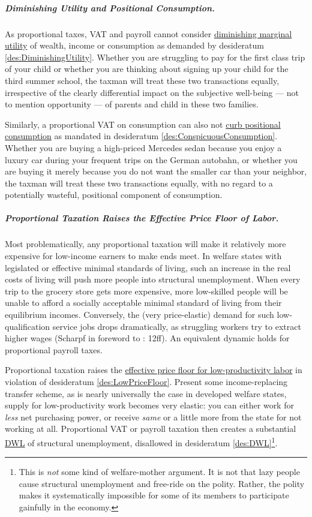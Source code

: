 \subparagraph{Diminishing Utility and Positional Consumption.} As proportional taxes, VAT and payroll cannot consider \hyperref[des:DiminishingUtility]{diminishing marginal utility} of wealth, income or consumption as demanded by desideratum \ref{des:DiminishingUtility}. Whether you are struggling to pay for the first class trip of your child or whether you are thinking about signing up your child for the third summer school, the taxman will treat these two transactions equally, irrespective of the clearly differential impact on the subjective well-being --- not to mention opportunity --- of parents and child in these two families.

Similarly, a proportional VAT on consumption can also not \hyperref[des:ConspicuousConsumption]{curb positional consumption} as mandated in desideratum \ref{des:ConspicuousConsumption}. Whether you are buying a high-priced Mercedes sedan because you enjoy a luxury car during your frequent trips on the German autobahn, or whether you are buying it merely because you do not want the smaller car than your neighbor, the taxman will treat these two transactions equally, with no regard to a potentially wasteful, positional component of consumption.

\subparagraph{Proportional Taxation Raises the Effective Price Floor of Labor.}  \label{sec:PropTaxDWL} Most problematically, any proportional taxation will make it relatively more expensive for low-income earners to make ends meet. In welfare states with legislated or effective minimal standards of living, such an increase in the real costs of living will push more people into structural unemployment. When every trip to the grocery store gets more expensive, more low-skilled people will be unable to afford a socially acceptable minimal standard of living from their equilibrium incomes. Conversely, the (very price-elastic) demand for such low-qualification service jobs drops dramatically, as struggling workers try to extract higher wages (Scharpf in foreword to \citealt{Ganghof2004}: 12ff). An equivalent dynamic holds for proportional payroll taxes.

Proportional taxation raises the \hyperref[des:LowPriceFloor]{effective price floor for low-productivity labor} in violation of desideratum \ref{des:LowPriceFloor}. Present some income-replacing transfer scheme, as is nearly universally the case in developed welfare states, supply for low-productivity work becomes very elastic: you can either work for \emph{less} net purchasing power, or receive \emph{same} or a little more from the state for not working at all. Proportional VAT or payroll taxation then creates a substantial \hyperref[des:DWL]{DWL} of structural unemployment, disallowed in desideratum \ref{des:DWL}\footnote{
	This is \emph{not} some kind of welfare-mother argument. It is not that lazy people cause structural unemployment and free-ride on the polity. Rather, the polity makes it systematically impossible for some of its members to participate gainfully in the economy.}.

